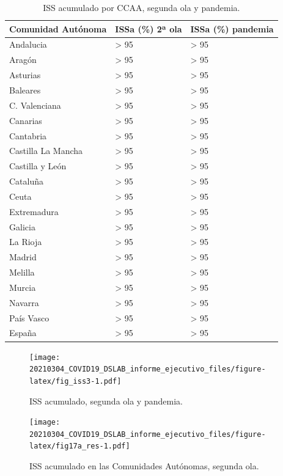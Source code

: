 \documentclass[
  11pt,
]{article}
\begin{document}
\begin{table}[!h]

\caption{\label{tab:tabla}ISS acumulado por CCAA, segunda ola y pandemia.}
\centering
\fontsize{9}{11}\selectfont
\begin{tabular}[t]{l|l|l}
\hline
Comunidad Autónoma & ISSa (\%) 2ª ola & ISSa (\%) pandemia\\
\hline
Andalucia & > 95 & > 95\\
\hline
Aragón & > 95 & > 95\\
\hline
Asturias & > 95 & > 95\\
\hline
Baleares & > 95 & > 95\\
\hline
C. Valenciana & > 95 & > 95\\
\hline
Canarias & > 95 & > 95\\
\hline
Cantabria & > 95 & > 95\\
\hline
Castilla La Mancha & > 95 & > 95\\
\hline
Castilla y León & > 95 & > 95\\
\hline
Cataluña & > 95 & > 95\\
\hline
Ceuta & > 95 & > 95\\
\hline
Extremadura & > 95 & > 95\\
\hline
Galicia & > 95 & > 95\\
\hline
La Rioja & > 95 & > 95\\
\hline
Madrid & > 95 & > 95\\
\hline
Melilla & > 95 & > 95\\
\hline
Murcia & > 95 & > 95\\
\hline
Navarra & > 95 & > 95\\
\hline
País Vasco & > 95 & > 95\\
\hline
España & > 95 & > 95\\
\hline
\end{tabular}
\end{table}

\begin{figure}
\centering
\texttt{[image: 20210304\_COVID19\_DSLAB\_informe\_ejecutivo\_files/figure-latex/fig\_iss3-1.pdf]}
\caption{\label{fig:fig_iss3} ISS acumulado, segunda ola y pandemia.}
\end{figure}

\vspace{0.2cm}

\begin{figure}
\centering
\texttt{[image: 20210304\_COVID19\_DSLAB\_informe\_ejecutivo\_files/figure-latex/fig17a\_res-1.pdf]}
\caption{\label{fig:fig17a_res} ISS acumulado en las Comunidades
Autónomas, segunda ola.}
\end{figure}
\end{document}
